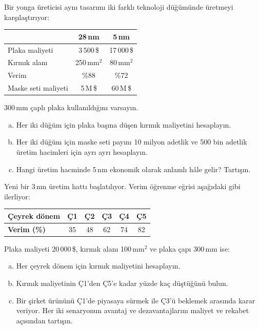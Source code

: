 \begin{alistirma}[\zor]
Bir yonga üreticisi aynı tasarımı iki farklı teknoloji düğümünde üretmeyi karşılaştırıyor:

\smallskip
\begin{tabular}{@{}lcc@{}}
\toprule
 & \textbf{28\,nm} & \textbf{5\,nm} \\
\midrule
Plaka maliyeti & 3\,500\,\$ & 17\,000\,\$ \\
Kırmık alanı & 250\,mm$^2$ & 80\,mm$^2$ \\
Verim & \%88 & \%72 \\
Maske seti maliyeti & 5\,M\,\$ & 60\,M\,\$ \\
\bottomrule
\end{tabular}
\smallskip

300\,mm çaplı plaka kullanıldığını varsayın.
\begin{enumerate}[(a)]
    \item Her iki düğüm için plaka başına düşen kırmık maliyetini hesaplayın.
    \item Her iki düğüm için maske seti payını 10 milyon adetlik ve 500 bin adetlik üretim hacimleri için ayrı ayrı hesaplayın.
    \item Hangi üretim hacminde 5\,nm ekonomik olarak anlamlı hâle gelir? Tartışın.
\end{enumerate}
\end{alistirma}

\begin{alistirma}[\zor]
Yeni bir 3\,nm üretim hattı başlatılıyor. Verim öğrenme eğrisi aşağıdaki gibi ilerliyor:

\smallskip
\begin{tabular}{@{}lccccc@{}}
\toprule
\textbf{Çeyrek dönem} & Ç1 & Ç2 & Ç3 & Ç4 & Ç5 \\
\midrule
\textbf{Verim (\%)} & 35 & 48 & 62 & 74 & 82 \\
\bottomrule
\end{tabular}
\smallskip

Plaka maliyeti 20\,000\,\$, kırmık alanı 100\,mm$^2$ ve plaka çapı 300\,mm ise:
\begin{enumerate}[(a)]
    \item Her çeyrek dönem için kırmık maliyetini hesaplayın.
    \item Kırmık maliyetinin Ç1'den Ç5'e kadar yüzde kaç düştüğünü bulun.
    \item Bir şirket ürününü Ç1'de piyasaya sürmek ile Ç3'ü beklemek arasında karar veriyor. Her iki senaryonun avantaj ve dezavantajlarını maliyet ve rekabet açısından tartışın.
\end{enumerate}
\end{alistirma}

